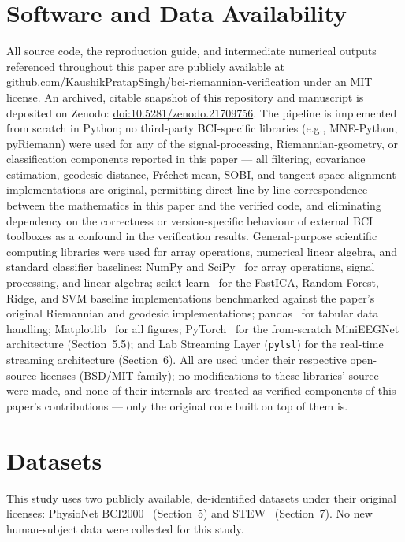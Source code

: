 \documentclass[11pt]{article}
\newcommand{\code}[1]{\texttt{#1}}
\begin{document}
\section*{Software and Data Availability}

All source code, the reproduction guide, and intermediate numerical outputs referenced throughout this paper are publicly available at \href{https://github.com/KaushikPratapSingh/bci-riemannian-verification}{github.com/KaushikPratapSingh/bci-riemannian-verification} under an MIT license. An archived, citable snapshot of this repository and manuscript is deposited on Zenodo: \href{https://doi.org/10.5281/zenodo.21709756}{doi:10.5281/zenodo.21709756}. The pipeline is implemented from scratch in Python; no third-party BCI-specific libraries (e.g., MNE-Python, pyRiemann) were used for any of the signal-processing, Riemannian-geometry, or classification components reported in this paper --- all filtering, covariance estimation, geodesic-distance, Fréchet-mean, SOBI, and tangent-space-alignment implementations are original, permitting direct line-by-line correspondence between the mathematics in this paper and the verified code, and eliminating dependency on the correctness or version-specific behaviour of external BCI toolboxes as a confound in the verification results. General-purpose scientific computing libraries were used for array operations, numerical linear algebra, and standard classifier baselines: NumPy and SciPy~\cite{harris2020,virtanen2020} for array operations, signal processing, and linear algebra; scikit-learn~\cite{pedregosa2011} for the FastICA, Random Forest, Ridge, and SVM baseline implementations benchmarked against the paper's original Riemannian and geodesic implementations; pandas~\cite{mckinney2010} for tabular data handling; Matplotlib~\cite{hunter2007} for all figures; PyTorch~\cite{paszke2019} for the from-scratch MiniEEGNet architecture (Section~5.5); and Lab Streaming Layer (\code{pylsl}) for the real-time streaming architecture (Section~6). All are used under their respective open-source licenses (BSD/MIT-family); no modifications to these libraries' source were made, and none of their internals are treated as verified components of this paper's contributions --- only the original code built on top of them is.

\section*{Datasets}

This study uses two publicly available, de-identified datasets under their original licenses: PhysioNet BCI2000~\cite{schalk2004} (Section~5) and STEW~\cite{lim2018} (Section~7). No new human-subject data were collected for this study.
\end{document}
